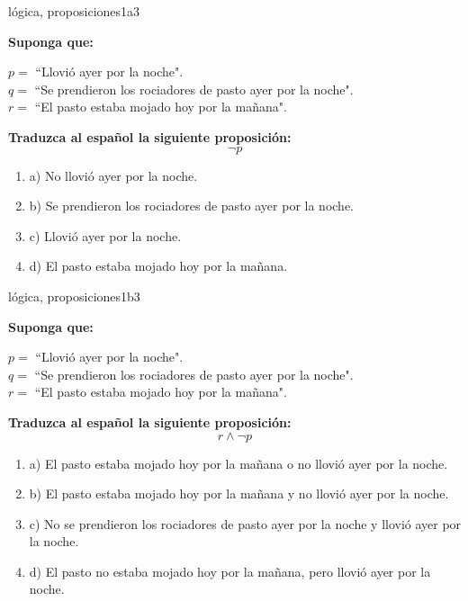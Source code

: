 \documentclass{article}
\begin{document}
\begin{question}{1}{lógica, proposiciones}{1}{a}{3}{
\textbf{Suponga que:} \smallskip

\(p = \) ``Llovió ayer por la noche".\\
\(q = \) ``Se prendieron los rociadores de pasto ayer por la noche".\\
\(r = \) ``El pasto estaba mojado hoy por la mañana".\smallskip

\textbf{Traduzca al español la siguiente proposición:}
\[
\neg p
\]

\begin{enumerate}
    \item a) No llovió ayer por la noche.
    \item b) Se prendieron los rociadores de pasto ayer por la noche.
    \item c) Llovió ayer por la noche.
    \item d) El pasto estaba mojado hoy por la mañana.
\end{enumerate}
}
\end{question}

\begin{question}{2}{lógica, proposiciones}{1}{b}{3}{
\textbf{Suponga que:} \smallskip

\(p = \) ``Llovió ayer por la noche".\\
\(q = \) ``Se prendieron los rociadores de pasto ayer por la noche".\\
\(r = \) ``El pasto estaba mojado hoy por la mañana".\smallskip

\textbf{Traduzca al español la siguiente proposición:}
\[
r \land \neg p
\]

\begin{enumerate}
    \item a) El pasto estaba mojado hoy por la mañana o no llovió ayer por la noche.
    \item b) El pasto estaba mojado hoy por la mañana y no llovió ayer por la noche.
    \item c) No se prendieron los rociadores de pasto ayer por la noche y llovió ayer por la noche.
    \item d) El pasto no estaba mojado hoy por la mañana, pero llovió ayer por la noche.
\end{enumerate}
}
\end{question}
\end{document}
